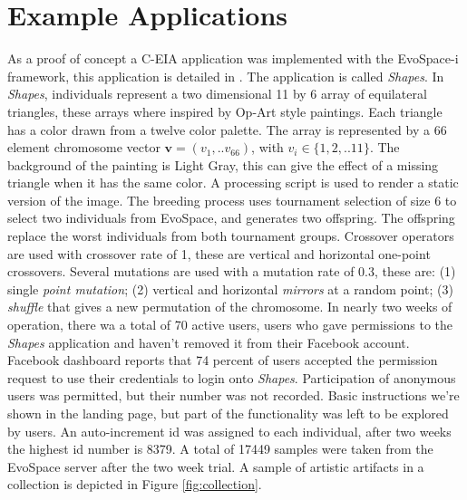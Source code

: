\documentclass{sig-alternate}
\begin{document}
\section{Example Applications}
As a proof of concept a C-EIA application was implemented with the EvoSpace-i framework, this application is detailed in \cite{Musart}. The application is called \emph{Shapes}. In \emph{Shapes}, individuals represent a two dimensional 11 by 6 array of equilateral triangles, these arrays where inspired by Op-Art style paintings.
Each triangle has a color drawn from a twelve color palette.
The array is represented by a 66 element chromosome vector $\mathbf{v}=(v_1,..v_{66})$, with $v_i \in \{ 1,2,..11 \}$.
The background of the painting is Light Gray, this can give the effect of a missing triangle when it has the same color.
A processing script is used to render a static version of the image.
The breeding process uses tournament selection of size 6 to select two individuals from EvoSpace,
and generates two offspring.
The offspring replace the worst individuals from both tournament groups.
Crossover operators are used with crossover rate of 1, these are vertical and horizontal one-point crossovers.
Several mutations are used with a mutation rate of 0.3, these are:
(1) single \emph{point mutation}; (2) vertical and horizontal \emph{mirrors} at a random point;
(3) \emph{shuffle} that gives a new permutation of the chromosome.
In nearly two weeks of operation, there wa a total of 70 active users, users who gave permissions to the \emph{Shapes} application and haven't
removed it from their Facebook account.
Facebook dashboard reports that 74 percent of users accepted the permission request to use their credentials to login onto \emph{Shapes}.
Participation of anonymous users was permitted, but their number was not recorded.
Basic instructions we're shown in the landing page, but part of the functionality was left to be explored by users.
An auto-increment id was assigned to each individual, after two weeks the highest id number is 8379.
A total of 17449 samples were taken from the EvoSpace server after the two week trial. A sample of artistic artifacts in a collection is depicted in Figure \ref{fig:collection}.
\end{document}
